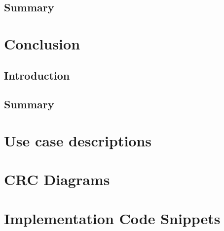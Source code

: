 \documentclass[11pt,oneside]{report}
\newcommand\code[1]{\texttt{#1}}
\begin{document}
	\section{Summary}
	
	\chapter{Conclusion}\label{chap:concl}
	\section{Introduction}
	\section{Summary}
	\clearpage
	
	
	\begin{appendices}
	\chapter{Use case descriptions} \label{app:use_case_descriptions}
			
			
			
			
			
			
			
	\chapter{CRC Diagrams} \label{app:crc_diagrams}
			
			
			
			
	\chapter{Implementation Code Snippets}
			
	\end{appendices}
	
\end{document}
